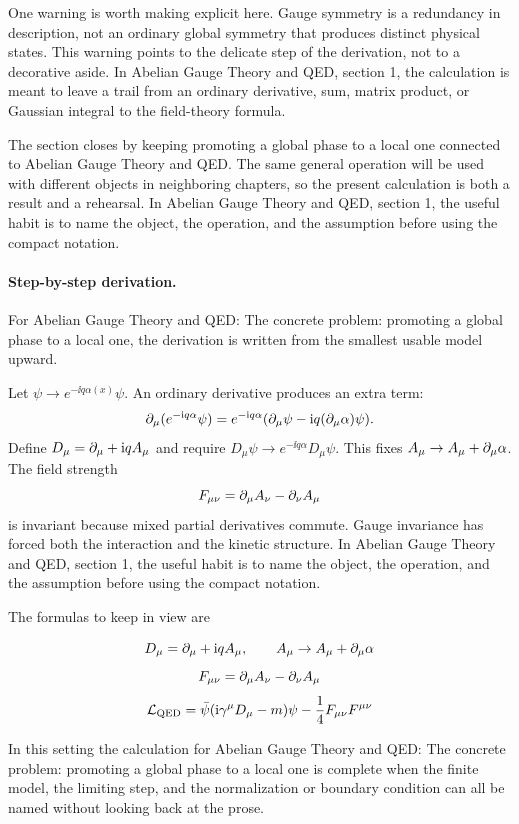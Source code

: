 One warning is worth making explicit here.  Gauge symmetry is a redundancy in description, not an ordinary global symmetry that produces distinct physical states.  This warning points to the delicate step of the derivation, not to a decorative aside.  In Abelian Gauge Theory and QED, section 1, the calculation is meant to leave a trail from an ordinary derivative, sum, matrix product, or Gaussian integral to the field-theory formula.

The section closes by keeping promoting a global phase to a local one connected to Abelian Gauge Theory and QED.  The same general operation will be used with different objects in neighboring chapters, so the present calculation is both a result and a rehearsal.  In Abelian Gauge Theory and QED, section 1, the useful habit is to name the object, the operation, and the assumption before using the compact notation.



\paragraph{Step-by-step derivation.}

For Abelian Gauge Theory and QED: The concrete problem: promoting a global phase to a local one, the derivation is written from the smallest usable model upward.

Let \(\psi\to e^{-\ii q\alpha(x)}\psi\).  An ordinary derivative produces an extra term:
\[
  \partial_\mu(e^{-\mathrm i q\alpha}\psi)
  =
  e^{-\mathrm i q\alpha}(\partial_\mu\psi-\mathrm i q(\partial_\mu\alpha)\psi).
\]
Define \(D_\mu=\partial_\mu+\mathrm i qA_\mu\) and require \(D_\mu\psi\to e^{-\ii q\alpha}D_\mu\psi\).  This fixes \(A_\mu\to A_\mu+\partial_\mu\alpha\).  The field strength
\[
  F_{\mu\nu}=\partial_\mu A_\nu-\partial_\nu A_\mu
\]
is invariant because mixed partial derivatives commute.  Gauge invariance has forced both the interaction and the kinetic structure.  In Abelian Gauge Theory and QED, section 1, the useful habit is to name the object, the operation, and the assumption before using the compact notation.

The formulas to keep in view are

\[
  D_\mu=\partial_\mu+\mathrm i qA_\mu,\qquad A_\mu\to A_\mu+\partial_\mu\alpha
\]
\[
  F_{\mu\nu}=\partial_\mu A_\nu-\partial_\nu A_\mu
\]
\[
  \mathcal L_{\mathrm{QED}}=\bar\psi(\mathrm i\gamma^\mu D_\mu-m)\psi-\frac14F_{\mu\nu}F^{\mu\nu}
\]

In this setting the calculation for Abelian Gauge Theory and QED: The concrete problem: promoting a global phase to a local one is complete when the finite model, the limiting step, and the normalization or boundary condition can all be named without looking back at the prose.




